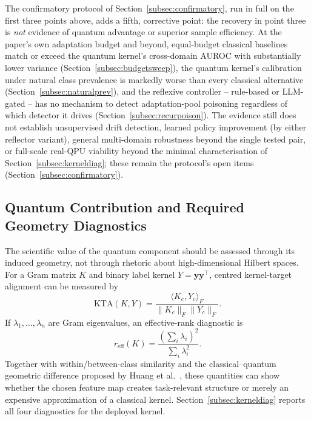 \documentclass[conference]{IEEEtran}
\begin{document}
The confirmatory protocol of Section~\ref{subsec:confirmatory}, run in
full on the first three points above, adds a fifth, corrective point:
the recovery in point three is \emph{not} evidence of quantum advantage
or superior sample efficiency. At the paper's own adaptation budget and
beyond, equal-budget classical baselines match or exceed the quantum
kernel's cross-domain AUROC with substantially lower variance
(Section~\ref{subsec:budgetsweep}), the quantum kernel's calibration
under natural class prevalence is markedly worse than every classical
alternative (Section~\ref{subsec:naturalprev}), and the reflexive
controller -- rule-based or LLM-gated -- has no mechanism to detect
adaptation-pool poisoning regardless of which detector it drives
(Section~\ref{subsec:recurpoison}). The evidence still does not establish
unsupervised drift detection, learned policy improvement (by either
reflector variant), general multi-domain robustness beyond the single
tested pair, or full-scale real-QPU viability beyond the minimal
characterisation of Section~\ref{subsec:kerneldiag}; these remain the
protocol's open items (Section~\ref{subsec:confirmatory}).

\subsection{Quantum Contribution and Required Geometry Diagnostics}
\label{subsec:kta_geo}

The scientific value of the quantum component should be assessed through
its induced geometry, not through rhetoric about high-dimensional Hilbert
spaces. For a Gram matrix $K$ and binary label kernel $Y = \mathbf{y}
\mathbf{y}^{\top}$, centred kernel-target alignment can be measured by
\begin{equation}
\text{KTA}(K,Y) = \frac{\langle K_c, Y_c \rangle_F}{\|K_c\|_F \|Y_c\|_F}.
\label{eq:kta}
\end{equation}
If $\lambda_1,\dots,\lambda_n$ are Gram eigenvalues, an effective-rank
diagnostic is
\begin{equation}
r_{\text{eff}}(K) = \frac{\left(\sum_i \lambda_i\right)^2}{\sum_i
\lambda_i^2}.
\label{eq:reff}
\end{equation}
Together with within/between-class similarity and the classical--quantum
geometric difference proposed by Huang et al.\ \cite{huang2021}, these
quantities can show whether the chosen feature map creates task-relevant
structure or merely an expensive approximation of a classical kernel.
Section~\ref{subsec:kerneldiag} reports all four diagnostics for the
deployed kernel.
\end{document}
